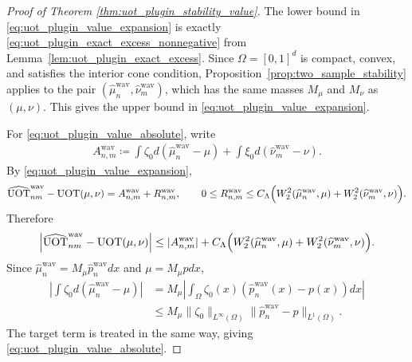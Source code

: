 \documentclass[11pt,reqno]{amsart}
\theoremstyle{definition}
\renewcommand{\hat}{\widehat}
\begin{document}
\begin{proof}[Proof of Theorem \ref{thm:uot_plugin_stability_value}]
The lower bound in \eqref{eq:uot_plugin_value_expansion} is exactly \eqref{eq:uot_plugin_exact_excess_nonnegative} from Lemma~\ref{lem:uot_plugin_exact_excess}.
Since $\Omega=[0,1]^d$ is compact, convex, and satisfies the interior cone condition, Proposition~\ref{prop:two_sample_stability} applies to the pair $(\hat\mu_n^{\mathrm{wav}},\hat\nu_m^{\mathrm{wav}})$, which has the same masses $M_\mu$ and $M_\nu$ as $(\mu,\nu)$. This gives the upper bound in \eqref{eq:uot_plugin_value_expansion}.

For \eqref{eq:uot_plugin_value_absolute}, write
\begin{align*}
    A_{n,m}^{\mathrm{wav}}
    \coloneqq
    \int \zeta_0 d(\hat\mu_n^{\mathrm{wav}}-\mu)
    + \int \xi_0 d(\hat\nu_m^{\mathrm{wav}}-\nu).
\end{align*}
By \eqref{eq:uot_plugin_value_expansion},
\begin{align*}
    \widehat{\mathrm{UOT}}_{nm}^{\mathrm{wav}} - \mathrm{UOT}(\mu,\nu)
    = A_{n,m}^{\mathrm{wav}} + R_{n,m}^{\mathrm{wav}},
    \qquad
    0\le R_{n,m}^{\mathrm{wav}} \le C_\Lambda\Bigl(W_2^2(\hat\mu_n^{\mathrm{wav}},\mu)+W_2^2(\hat\nu_m^{\mathrm{wav}},\nu)\Bigr).
\end{align*}
Therefore
\begin{align*}
    \left|\widehat{\mathrm{UOT}}_{nm}^{\mathrm{wav}} - \mathrm{UOT}(\mu,\nu)\right|
    \le |A_{n,m}^{\mathrm{wav}}| + C_\Lambda\Bigl(W_2^2(\hat\mu_n^{\mathrm{wav}},\mu)+W_2^2(\hat\nu_m^{\mathrm{wav}},\nu)\Bigr).
\end{align*}
Since $\hat\mu_n^{\mathrm{wav}}=M_\mu\hat p_n^{\mathrm{wav}}dx$ and $\mu=M_\mu p dx$,
\begin{align*}
    \left|\int \zeta_0 d(\hat\mu_n^{\mathrm{wav}}-\mu)\right|
    &= M_\mu\left|\int_{\Omega} \zeta_0(x)(\hat p_n^{\mathrm{wav}}(x)-p(x)) dx\right| \\
    &\le M_\mu\|\zeta_0\|_{L^\infty(\Omega)}\|\hat p_n^{\mathrm{wav}}-p\|_{L^1(\Omega)}.
\end{align*}
The target term is treated in the same way, giving \eqref{eq:uot_plugin_value_absolute}.
\end{proof}
\end{document}
